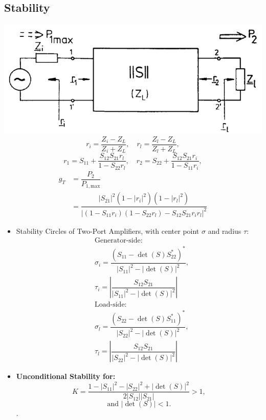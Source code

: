\subsection{Stability}
\includegraphics[width=.3\textwidth]{content/hfcomp/pictures/2-port_amplifier.png}
\begin{equation*}
    r_i = \dfrac{Z_i - Z_L}{Z_i + Z_L}, \quad r_l = \dfrac{Z_l - Z_L}{Z_l + Z_L},
\end{equation*}
\begin{equation*}
    r_1 = S_{11} + \dfrac{S_{12}S_{21}r_l}{1 - S_{22}r_l}, \quad r_2 = S_{22} + \dfrac{S_{12}S_{21}r_i}{1 - S_{11}r_i},
\end{equation*}
\begin{align*}
    g_T &= \dfrac{P_2}{P_{1,\mathrm{max}}}\\
    &=\dfrac{|S_{21}|^2 (1 - |r_i|^2) (1 - |r_l|^2)}{\left|(1 - S_{11}r_i)(1 - S_{22}r_l) - S_{12}S_{21} r_i r_l\right|^2}
\end{align*}
\begin{itemize}
    \itemsep0pt
    \item Stability Circles of Two-Port Amplifiers, with center point $\sigma$ and radius $\tau$:
        \begin{align*}
            &\text{Generator-side:}\\
            &\sigma_i = \dfrac{(S_{11} - \det(S) S_{22}^*)^*}{|S_{11}|^2 - |\det(S)|^2},\\
            &\tau_i = \left|\dfrac{S_{12} S_{21}}{|S_{11}|^2 - |\det(S)|^2}\right|\\
            &\text{Load-side:}\\
            &\sigma_l = \dfrac{(S_{22} - \det(S) S_{11}^*)^*}{|S_{22}|^2 - |\det(S)|^2},\\
            &\tau_l = \left|\dfrac{S_{12} S_{21}}{|S_{22}|^2 - |\det(S)|^2}\right|
        \end{align*}
    \item \textbf{Unconditional Stability for:}
        \begin{equation*}
            K = \dfrac{1 - |S_{11}|^2 - |S_{22}|^2 + |\det(S)|^2}{2 |S_{12}| |S_{21}|} > 1,
        \end{equation*}
        \begin{equation*}
            \text{and } |\det(S)| < 1.
        \end{equation*}.
\end{itemize}

